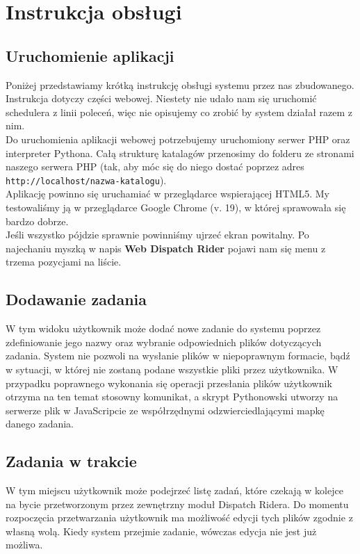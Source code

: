 \chapter{Instrukcja obsługi}
\section{Uruchomienie aplikacji}
Poniżej przedstawiamy krótką instrukcję obsługi systemu przez nas zbudowanego.
Instrukcja dotyczy części webowej. Niestety nie udało nam się uruchomić schedulera z linii
poleceń, więc nie opisujemy co zrobić by system działał razem z nim.
\\
Do uruchomienia aplikacji webowej potrzebujemy uruchomiony serwer PHP oraz interpreter Pythona.
Całą strukturę katalagów przenosimy do folderu ze stronami naszego serwera PHP (tak, aby móc
się do niego dostać poprzez adres \texttt{http://localhost/nazwa-katalogu}).
\\
Aplikację powinno się uruchamiać w przeglądarce wspierającej HTML5. My testowaliśmy ją w przeglądarce
Google Chrome (v. 19), w której sprawowała się bardzo dobrze.
\\
Jeśli wszystko pójdzie sprawnie powinniśmy ujrzeć ekran powitalny. Po najechaniu myszką w napis
\textbf{Web Dispatch Rider} pojawi nam się menu z trzema pozycjami na liście.

\section{Dodawanie zadania}
W tym widoku użytkownik może dodać nowe zadanie do systemu poprzez zdefiniowanie jego nazwy
oraz wybranie odpowiednich plików dotyczących zadania. System nie pozwoli na wysłanie plików
w niepoprawnym formacie, bądź w sytuacji, w której nie zostaną podane wszystkie pliki
przez użytkownika. W przypadku poprawnego wykonania się operacji przesłania plików
użytkownik otrzyma na ten temat stosowny komunikat, a skrypt Pythonowski utworzy na serwerze
plik w JavaScripcie ze współrzędnymi odzwierciedlającymi mapkę danego zadania.

\section{Zadania w trakcie}
W tym miejscu użytkownik może podejrzeć listę zadań, które czekają w kolejce na bycie przetworzonym
przez zewnętrzny moduł Dispatch Ridera. Do momentu rozpoczęcia przetwarzania użytkownik ma możliwość
edycji tych plików zgodnie z własną wolą. Kiedy system przejmie zadanie, wówczas edycja nie jest już
możliwa.

